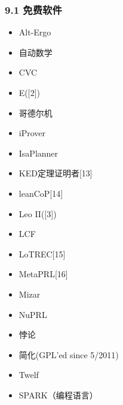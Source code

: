 \subsubsection{9.1 免费软件}
\begin{itemize}
\item Alt-Ergo
\item 自动数学
\item CVC
\item E([2])
\item 哥德尔机
\item iProver
\item IsaPlanner
\item KED定理证明者[13]
\item leanCoP[14]
\item Leo II([3])
\item LCF
\item LoTREC[15]
\item MetaPRL[16]
\item Mizar
\item NuPRL
\item 悖论
\item 简化(GPL'ed since 5/2011)
\item Twelf
\item SPARK（编程语言）
\end{itemize}
